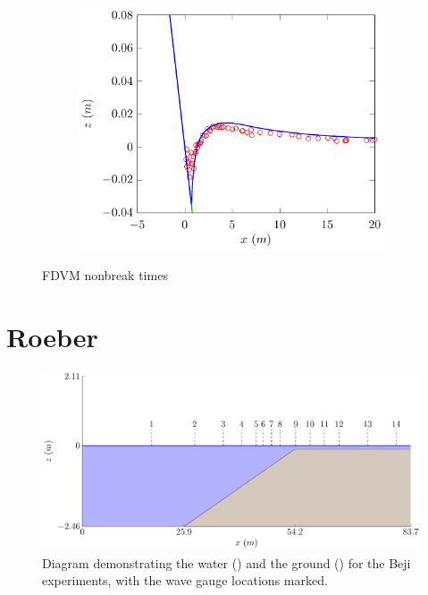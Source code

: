 \begin{figure}
\begin{subfigure}{0.5\textwidth}
		\includegraphics[width=\textwidth]{./chp6/figures/Experiment/Synolakis/H0p0185/FDVM/70s.pdf}
	\end{subfigure}
	\caption{FDVM nonbreak times}
	\label{fig:SynolakisFDVMNoBreak}
\end{figure}


\section{Roeber}






\begin{figure}
	\centering
	\includegraphics[width=\textwidth]{./chp6/figures/Experiment/Roeber/Trial8/WaveTank.pdf}
	\caption{Diagram demonstrating the water () and the ground  () for the Beji experiments, with the wave gauge locations marked.}
	\label{fig:RoeberWT}
\end{figure}


